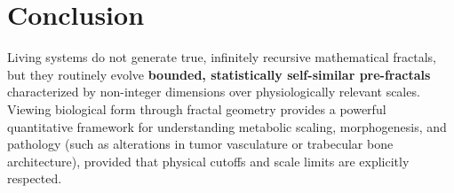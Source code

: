 \documentclass[11pt,a4paper]{article}
\begin{document}
\section{Conclusion}
Living systems do not generate true, infinitely recursive mathematical fractals, but they routinely evolve \textbf{bounded, statistically self-similar pre-fractals} characterized by non-integer dimensions over physiologically relevant scales. Viewing biological form through fractal geometry provides a powerful quantitative framework for understanding metabolic scaling, morphogenesis, and pathology (such as alterations in tumor vasculature or trabecular bone architecture), provided that physical cutoffs and scale limits are explicitly respected.
\end{document}
